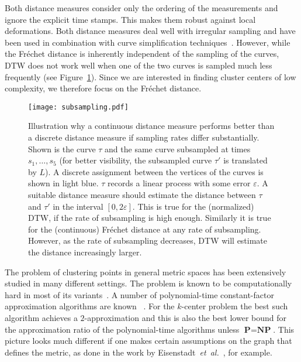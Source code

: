 \documentclass[11pt, letter]{article}
\newcommand{\etal}{\textit{e{}t~a{}l.}\xspace}
\newcommand{\figlab}[1]{\label{fig:#1}}
\newcommand{\figref}[1]{Figure~\ref{fig:#1}}
\newcommand{\NP}{\textbf{NP}} \newcommand{\spine}{\textsl{spine}}
\newcommand{\Frechet}{Fr\'echet\xspace}
\providecommand{\eps}{{\varepsilon}}\newcommand{\Astop}{\overline{a}}
\begin{document}
Both distance measures consider
only the ordering of the measurements and ignore the explicit time stamps. This
makes them robust against local deformations.  Both distance measures deal well
with irregular sampling and have been used in combination with curve
simplification techniques~\cite{ahmw-nltcs-05,dhw-afd-12,keogh1999scaling}.
However, while the \Frechet distance is inherently independent of the sampling
of the curves, DTW does not work well when one of the two curves is sampled
much less frequently (see \figref{subsampling}). Since we are interested in finding cluster centers of low
complexity, we therefore focus on the \Frechet distance.

\begin{figure}\centering
\texttt{[image: subsampling.pdf]}
\caption{Illustration why a continuous distance measure performs better than a
discrete distance measure if sampling rates differ substantially. Shown is the
curve $\tau$ and the same curve subsampled at times $s_1,\dots,s_5$ (for
better visibility, the subsampled curve $\tau'$ is translated by $L$). A discrete 
assignment between the vertices of the curves is shown in light blue.
$\tau$ records a linear process with some error $\eps$. A suitable distance measure should estimate
the distance between $\tau$ and $\tau'$ in the interval $[0,2\eps]$. This is true
for the (normalized) DTW, if the rate of subsampling is high enough. Similarly
it is true for the (continuous) \Frechet distance at any rate of subsampling. 
However, as the rate of subsampling decreases, DTW will estimate the distance
increasingly larger.
}
\figlab{subsampling}
\end{figure}

The problem of clustering points in general metric spaces has been extensively studied 
in many different settings. The problem is known to be computationally hard in most of its
variants~\cite{aloise2009nphard,jain2002greedy,megiddo1984geo,Vaziranibook}.
A number of polynomial-time constant-factor approximation algorithms are known 
~\cite{AryaGKMMP04,CharikarG05, cgts-kmedian-02, CharikarL12, c-kmc-09,feder1988optimal,Gonzalez1985,HochbaumShmoys1985,jain2002greedy,ls-akm-13}. 
For the $k$-center problem the best such algorithm achieves a $2$-approximation
\cite{Gonzalez1985, HochbaumShmoys1985} and this is also the best lower bound
for the approximation ratio of the polynomial-time algorithms unless $\textbf{P}=\NP$. This picture
looks much different if one makes certain assumptions on the graph that defines
the metric, as done in the work by Eisenstadt~\etal~\cite{emk-akcpg-14}, for
example. 
\end{document}
